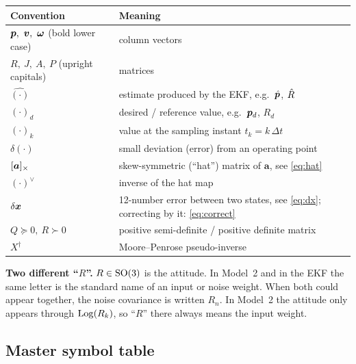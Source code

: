\begin{center}\small
\begin{tabularx}{\linewidth}{@{}l X@{}}
\toprule
\textbf{Convention} & \textbf{Meaning}\\
\midrule
$\vp,\ \vv,\ \vw$ (bold lower case) & column vectors\\
$R,\ J,\ A,\ P$ (upright capitals) & matrices\\
$\hat{(\cdot)}$ & estimate produced by the EKF, e.g.\ $\hat{\bm p}$, $\hat{R}$\\
$(\cdot)_d$ & desired / reference value, e.g.\ $\bm{p}_d$, $R_d$\\
$(\cdot)_k$ & value at the sampling instant $t_k=k\,\Delta t$\\
$\delta(\cdot)$ & small deviation (error) from an operating point\\
$[\bm a]_{\times}$ & skew-symmetric (``hat'') matrix of $\bm a$, see \eqref{eq:hat}\\
$(\cdot)^\vee$ & inverse of the hat map\\
$\delta\bm{x}$ & 12-number error between two states, see \eqref{eq:dx}; correcting by it: \eqref{eq:correct}\\
$Q\succeq0,\ R\succ0$ & positive semi-definite / positive definite matrix\\
$X^\dagger$ & Moore--Penrose pseudo-inverse\\
\bottomrule
\end{tabularx}
\end{center}

\textbf{Two different ``$R$''.} $R\in\mathrm{SO}(3)$ is the attitude. In Model~2 and in the EKF the same letter is the
standard name of an input or noise weight. When both could appear together, the noise covariance is written
$R_n$. In Model~2 the attitude only appears through $\mathrm{Log}(R_k)$, so ``$R$'' there always means the input weight.

\subsection{Master symbol table}

